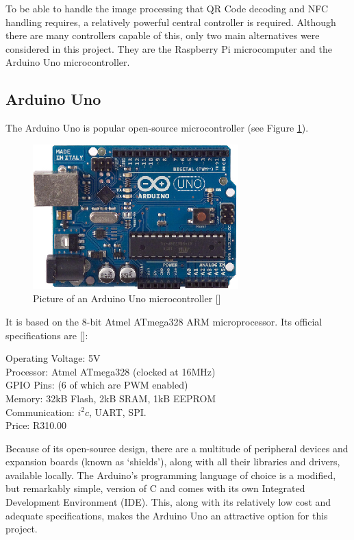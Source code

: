 To be able to handle the image processing that QR Code decoding and NFC handling requires, a
relatively powerful central controller is required. Although there are many controllers capable
of this, only two main alternatives were considered in this project. They are the Raspberry Pi microcomputer and
the Arduino Uno microcontroller.

\subsection{Arduino Uno}

The Arduino Uno is popular open-source microcontroller (see Figure \ref{fig:arduino}). 

\begin{figure}[h]
\centering
\includegraphics[scale=1.5]{arduino.eps}
\caption[Picture of an Arduino Uno microcontroller]{Picture of an Arduino Uno microcontroller
[\cite{website:arduino-specs}]}
\label{fig:arduino}
\end{figure}

It is
based on the 8-bit Atmel ATmega328 ARM microprocessor. Its official specifications are [\cite{website:arduino-specs}]:

\begin{tabbing}

Operating Voltage: \= 5V \\ 
Processor: \> Atmel ATmega328 (clocked at 16MHz) \\
GPIO Pins:  (6 of which are PWM enabled) \\
Memory: \> 32kB Flash, 2kB SRAM, 1kB EEPROM \\
Communication: \> $i^2c$, UART, SPI. \\
Price: \> R310.00 \\

\end{tabbing}

Because of its open-source design, there are a multitude of peripheral devices and expansion
boards (known as `shields'), along with all their libraries and drivers, available locally. The
Arduino's programming language of choice is a modified, but remarkably simple, version of C
and comes with its own Integrated Development Environment (IDE). This, along with its relatively low cost and adequate
specifications, makes the Arduino Uno an attractive option for this project.

